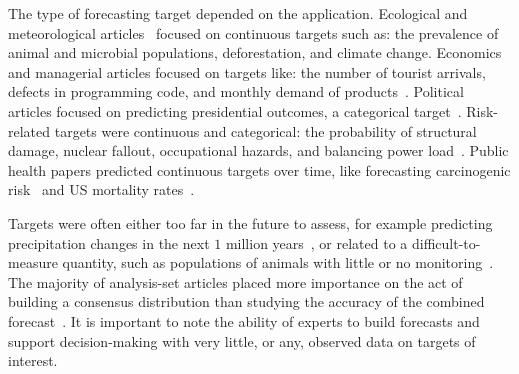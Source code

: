 \documentclass[preprint,authoryear]{elsarticle}
\begin{document}
The type of forecasting target depended on the application.
Ecological and meteorological articles~\citep{johnson2018making,cooke2014out,li2012preliminary,tartakovsky2007probabilistic,morales2017characterization,borsuk2004predictive,abramson1996hailfinder,mantyka2014understanding,kurowicka2010probabilistic,wang2018bayesian} focused on continuous targets such as: the prevalence of animal and microbial populations, deforestation, and climate change.
Economics and managerial articles focused on targets like: the number of tourist arrivals, defects in programming code, and monthly demand of products~\citep{song2013combining,kabak2008aggregating,huang2016improving,failing2004using,shin2013robust}.
Political articles focused on predicting presidential outcomes, a categorical target~\citep{hurley2002combining,graefe2014accuracy,morgan2014use,graefe2015accuracy,graefe2018predicting,graefe2014combining}.
Risk-related targets were continuous and categorical: the probability of structural damage, nuclear fallout, occupational hazards, and balancing power load~\citep{klas2010support,zio1997accounting,cabello2012combination,adams2009acceptability,neves2008life,jana2019interval,hathout2016uncertainty,wang2008probabilistic,ren2002optimal,zio1996use,baecke2017investigating,brito2016bayesian,craig2001bayesian,mu1999multi,brito2012behavioral}.
Public health papers predicted continuous targets over time, like forecasting carcinogenic risk~\citep{evans1994use} and US mortality rates~\cite{alho1992estimating}.

Targets were often either too far in the future to assess, for example predicting precipitation changes in the next $1$ million years~\citep{zio1997accounting}, or related to a difficult-to-measure quantity, such as populations of animals with little or no monitoring~\cite{johnson2018making,borsuk2004predictive,mantyka2014understanding}.
The majority of analysis-set articles placed more importance on the act of building a consensus distribution than studying the accuracy of the combined forecast~\citep{johnson2018making,cooke2014out,li2012preliminary,klas2010support,zio1997accounting,song2013combining,clemen2007advances,tartakovsky2007probabilistic,morgan2014use,borsuk2004predictive,kabak2008aggregating,cabello2012combination,adams2009acceptability,neves2008life,failing2004using,evans1994use,hora2015calibration,abramson1996hailfinder,hathout2016uncertainty,wang2008probabilistic,mantyka2014understanding,kurowicka2010probabilistic,zio1996use,brito2016bayesian,gu2016expert,mu1999multi,wang2018bayesian,shin2013robust,brito2012behavioral,baron2014two}.
It is important to note the ability of experts to build forecasts and support decision-making with very little, or any, observed data on targets of interest.
\end{document}
